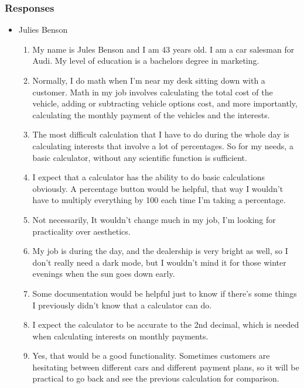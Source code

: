 \documentclass[titlepage]{article}
\begin{document}
            \subsubsection{Responses}
                \begin{itemize}
                    \item Julies Benson
                        \begin{enumerate}
                            \item My name is Jules Benson and I am 43 years old. I am a car salesman for Audi. My level of education is a bachelors degree in marketing.
                            \item Normally, I do math when I’m near my desk sitting down with a customer. Math in my job involves calculating the total cost of the vehicle, adding or subtracting vehicle options cost, and more importantly, calculating the monthly payment of the vehicles and the interests.
                            \item The most difficult calculation that I have to do during the whole day is calculating interests that involve a lot of percentages. So for my needs, a basic calculator, without any scientific function is sufficient.
                            \item I expect that a calculator has the ability to do basic calculations obviously. A percentage button would be helpful, that way I wouldn’t have to multiply everything by 100 each time I’m taking a percentage.
                            \item Not necessarily, It wouldn’t change much in my job, I’m looking for practicality over aesthetics.
                            \item My job is during the day, and the dealership is very bright as well, so I don’t really need a dark mode, but I wouldn’t mind it for those winter evenings when the sun goes down early.
                            \item Some documentation would be helpful just to know if there’s some things I previously didn’t know that a calculator can do.
                            \item I expect the calculator to be accurate to the 2nd decimal, which is needed when calculating interests on monthly payments.
                            \item Yes, that would be a good functionality. Sometimes customers are hesitating between different cars and different payment plans, so it will be practical to go back and see the previous calculation for comparison.

\end{enumerate}
\end{itemize}
\end{document}
